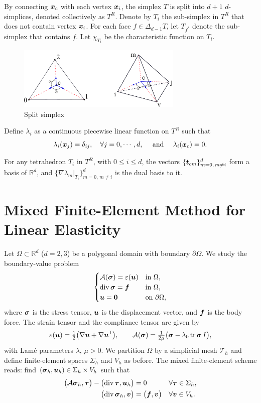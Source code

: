 \documentclass[letterpaper,12pt]{article}
\begin{document}
By connecting $\boldsymbol{x}_c$ with each vertex $\boldsymbol{x}_i$, the simplex $T$ is split into $d+1$ $d$-simplices, denoted collectively as $T^R$. Denote by $T_i$ the sub-simplex in $T^R$ that does not contain vertex $\boldsymbol{x}_i$. For each face $f \in \Delta_{d-1} T$, let $T_{f^*}$ denote the sub-simplex that contains $f$. Let $\chi_{T_i}$ be the characteristic function on $T_i$.

\begin{figure}[h]
\centering
\includegraphics[width=0.7\textwidth]{./figures/splite_cell.pdf}
\caption{Split simplex}
\end{figure}

Define $\lambda_i$ as a continuous piecewise linear function on $T^R$ such that
$$
\lambda_i(\boldsymbol{x}_j) = \delta_{ij}, \quad \forall j = 0, \cdots, d, \quad 
\text{ and } \quad \lambda_i(\boldsymbol{x}_c) = 0.
$$

\begin{lemma}
\label{lem:dual}
For any tetrahedron $T_i$ in $T^R$, with $0\leq i \leq d$, the vectors 
$\{\boldsymbol{t}_{cm}\}_{m=0,\, m\ne i}^d$ form a basis of $\mathbb{R}^d$, and 
$\{\nabla \lambda_{m}|_{T_i}\}_{m=0,\, m\ne i}^d$ is the dual basis to it.
\end{lemma}

\section{Mixed Finite-Element Method for Linear Elasticity}\label{sec:mixed}
Let $\Omega\subset\mathbb{R}^d$ ($d=2,3$) be a polygonal domain with boundary $\partial\Omega$.
We study the boundary-value problem
\[
\begin{cases}
\mathcal{A}(\boldsymbol{\sigma})=\varepsilon(\boldsymbol{u}) & \text{in }\Omega,\\
\mathop{\mathrm{div}}\boldsymbol{\sigma}=\boldsymbol{f} & \text{in }\Omega,\\
\boldsymbol{u}=\mathbf{0} & \text{on }\partial\Omega,
\end{cases}
\]
where $\boldsymbol{\sigma}$ is the stress tensor, $\boldsymbol{u}$ is the displacement vector,
and $\boldsymbol{f}$ is the body force.
The strain tensor and the compliance tensor are given by
\[
\varepsilon(\boldsymbol{u})=\tfrac12\bigl(\nabla\boldsymbol{u}+\nabla\boldsymbol{u}^{\mathsf{T}}\bigr),\qquad
\mathcal{A}(\boldsymbol{\sigma})=\tfrac1{2\mu}\bigl(\boldsymbol{\sigma}-\lambda_0\operatorname{tr}\boldsymbol{\sigma}\,I\bigr),
\]
with Lamé parameters $\lambda$, $\mu>0$.
We partition $\Omega$ by a simplicial mesh $\mathcal{T}_h$ and define
finite-element spaces $\Sigma_h$ and $V_h$ as before.
The mixed finite-element scheme reads:
find $(\boldsymbol{\sigma}_h,\boldsymbol{u}_h)\in\Sigma_h\times V_h$ such that
\[
\begin{aligned}
\bigl(\mathcal{A}\boldsymbol{\sigma}_h,\boldsymbol{\tau}\bigr) - \bigl(\mathop{\mathrm{div}}\boldsymbol{\tau},\boldsymbol{u}_h\bigr) &=0
	&&\forall \boldsymbol{\tau}\in\Sigma_h,\\
\bigl(\mathop{\mathrm{div}}\boldsymbol{\sigma}_h,\boldsymbol{v}\bigr) &=\bigl(\boldsymbol{f},\boldsymbol{v}\bigr)
	&&\forall \boldsymbol{v}\in V_h.
\end{aligned}
\]
\end{document}

